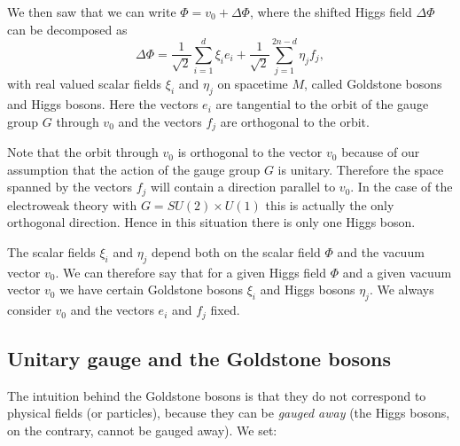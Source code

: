 \documentclass[11pt]{amsart}
\theoremstyle{definition}
\theoremstyle{remark}
\numberwithin{equation}{section}
\begin{document}
We then saw that we can write $\Phi=v_0+\Delta\Phi$, where the shifted Higgs field $\Delta\Phi$ can be decomposed as 
\begin{equation*}
\Delta\Phi=\frac{1}{\sqrt{2}}\sum_{i=1}^d\xi_ie_i+\frac{1}{\sqrt{2}}\sum_{j=1}^{2n-d}\eta_jf_j,
\end{equation*}
with real valued scalar fields $\xi_i$ and $\eta_j$ on spacetime $M$, called Goldstone bosons  and Higgs bosons. Here the vectors $e_i$ are tangential to the orbit of the gauge group $G$ through $v_0$ and the vectors $f_j$ are orthogonal to the orbit.

Note that the orbit through $v_0$ is orthogonal to the vector $v_0$ because of our assumption that the action of the gauge group $G$ is unitary. Therefore the space spanned by the vectors $f_j$ will contain a direction parallel to $v_0$. In the case of the electroweak theory with $G=SU(2)\times U(1)$ this is actually the only orthogonal direction. Hence in this situation there is only one Higgs boson.

The scalar fields $\xi_i$ and $\eta_j$ depend both on the scalar field $\Phi$ and the vacuum vector $v_0$. We can therefore say that for a given Higgs field $\Phi$ and a given vacuum vector $v_0$ we have certain Goldstone bosons $\xi_i$ and Higgs bosons $\eta_j$. We always consider $v_0$ and the vectors $e_i$ and $f_j$ fixed.

\subsection{Unitary gauge and the Goldstone bosons}
The intuition behind the Goldstone bosons is that they do not correspond to physical fields (or particles), because they can be {\em gauged away} (the Higgs bosons, on the contrary, cannot be gauged away). We set:
\end{document}
